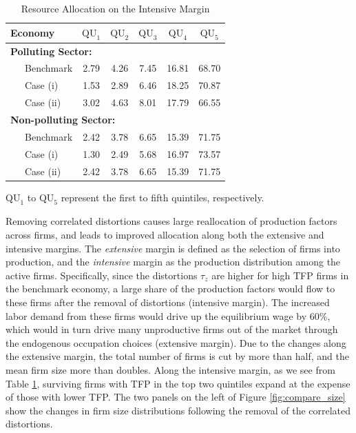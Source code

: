 \documentclass[AEJ]{AEA}
\begin{document}
\begin{table}[t]
\footnotesize
\centering
\caption{Resource Allocation on the Intensive Margin}
\begin{tabular}{lccccc}%
    \hline \hline
    Economy           & $\text{QU}_1$ & $\text{QU}_2$ & $\text{QU}_3$ & $\text{QU}_4$ & $\text{QU}_5$ \\
    \hline
    \multicolumn{3}{l}{\textbf{Polluting Sector:}} \\
    \ \ \ Benchmark   & 2.79          & 4.26          & 7.45          & 16.81         & 68.70          \\
    \ \ \ Case (i)    & 1.53          & 2.89          & 6.46          & 18.25         & 70.87          \\
    \ \ \ Case (ii)   & 3.02          & 4.63          & 8.01          & 17.79         & 66.55          \\
    \hline
    \multicolumn{3}{l}{\textbf{Non-polluting Sector:}} \\
    \ \ \ Benchmark   & 2.42          & 3.78          & 6.65          & 15.39         & 71.75          \\
    \ \ \ Case (i)    & 1.30          & 2.49          & 5.68          & 16.97         & 73.57          \\
    \ \ \ Case (ii)   & 2.42          & 3.78          & 6.65          & 15.39         & 71.75          \\
    \hline
\end{tabular}
\begin{tablenotes}
     $\text{QU}_1$ to $\text{QU}_5$ represent the first to fifth quintiles, respectively.
\end{tablenotes}
\label{tab:talentdist}
\end{table}

Removing correlated distortions causes large reallocation of production factors across firms, and leads to improved allocation along both the extensive and intensive margins. The \textit{extensive} margin is defined as the selection of firms into production, and the \textit{intensive} margin as the production distribution among the active firms. Specifically, since the distortions $\tau_z$ are higher for high TFP firms in the benchmark economy, a large share of the production factors would flow to these firms after the removal of distortions (intensive margin). The increased labor demand from these firms would drive up the equilibrium wage by 60\%, which would in turn drive many unproductive firms out of the market through the endogenous occupation choices (extensive margin). Due to the changes along the extensive margin, the total number of firms is cut by more than half, and the mean firm size more than doubles. Along the intensive margin, as we see from Table \ref{tab:talentdist}, surviving firms with TFP in the top two quintiles expand at the expense of those with lower TFP. The two panels on the left of Figure \ref{fig:compare_size} show the changes in firm size distributions following the removal of the correlated distortions.
\end{document}
